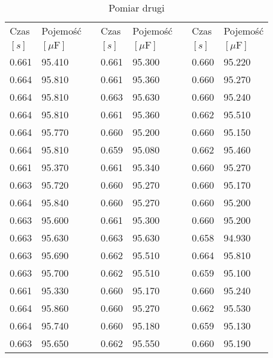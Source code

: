 \documentclass[12pt]{mwrep}
\begin{document}
	\begin{table}[H]\caption{Pomiar drugi}\label{tab:2}
		\begin{tabularx}{\textwidth}{|Y|Y|p{2mm}|Y|Y|p{2mm}|Y|Y|}
			Czas & Pojemość && Czas & Pojemość && Czas & Pojemość \\
			$[s]$ & $[\mu \text{F}]$&&$[s]$ & $[\mu \text{F}]$&&$[s]$ & $[\mu \text{F}]$\\
			0.661 & 95.410 && 0.661 & 95.300 && 0.660 & 95.220 \\
			0.664 & 95.810 && 0.661 & 95.360 && 0.660 & 95.270 \\
			0.664 & 95.810 && 0.663 & 95.630 && 0.660 & 95.240 \\
			0.664 & 95.810 && 0.661 & 95.360 && 0.662 & 95.510 \\
			0.664 & 95.770 && 0.660 & 95.200 && 0.660 & 95.150 \\
			0.664 & 95.810 && 0.659 & 95.080 && 0.662 & 95.460 \\
			0.661 & 95.370 && 0.661 & 95.340 && 0.660 & 95.270 \\
			0.663 & 95.720 && 0.660 & 95.270 && 0.660 & 95.170 \\
			0.664 & 95.840 && 0.660 & 95.270 && 0.660 & 95.200 \\
			0.663 & 95.600 && 0.661 & 95.300 && 0.660 & 95.200 \\
			0.663 & 95.630 && 0.663 & 95.630 && 0.658 & 94.930 \\
			0.663 & 95.690 && 0.662 & 95.510 && 0.664 & 95.810 \\
			0.663 & 95.700 && 0.662 & 95.510 && 0.659 & 95.100 \\
			0.661 & 95.330 && 0.660 & 95.170 && 0.660 & 95.240 \\
			0.664 & 95.860 && 0.660 & 95.270 && 0.662 & 95.530 \\
			0.664 & 95.740 && 0.660 & 95.180 && 0.659 & 95.130 \\
			0.663 & 95.650 && 0.662 & 95.550 && 0.660 & 95.190 \\

\end{tabularx}
\end{table}
\end{document}
